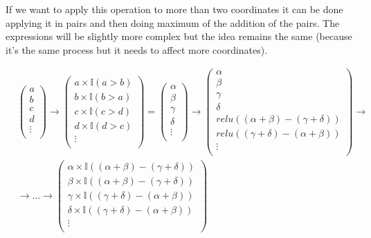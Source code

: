 If we want to apply this operation to more than two coordinates it can be done applying it in pairs and then doing maximum of the addition of the pairs. The expressions will be slightly more complex but the idea remains the same (because it's the same process but it needs to affect more coordinates).


\begin{align*}
    & \left( \begin{matrix} a \\ b \\ c \\ d \\ \vdots \\ \end{matrix} \right)
    \rightarrow
    \left( \begin{matrix} a \times \mathbb{I}(a>b) \\ b \times \mathbb{I}(b>a) \\ c \times \mathbb{I}(c>d) \\ d \times \mathbb{I}(d>c) \\ \vdots \\ \end{matrix} \right)
    = \left( \begin{matrix} \alpha \\ \beta \\ \gamma \\ \delta \\ \vdots \\ \end{matrix} \right)
    \rightarrow
    \left(\begin{matrix}
        \alpha \\ \beta \\ \gamma \\ \delta \\ 
        relu((\alpha + \beta) - (\gamma + \delta)) \\
        relu((\gamma + \delta) - (\alpha + \beta)) \\       
        \vdots \\
    \end{matrix}\right)
    \rightarrow \\ &\rightarrow
    \dots \rightarrow
    \left( \begin{matrix} 
        \alpha \times \mathbb{I}((\alpha + \beta) - (\gamma + \delta)) \\ 
        \beta  \times \mathbb{I}((\alpha + \beta) - (\gamma + \delta)) \\ 
        \gamma \times \mathbb{I}((\gamma + \delta) - (\alpha + \beta)) \\ 
        \delta \times \mathbb{I}((\gamma + \delta) - (\alpha + \beta)) \\ 
        \vdots \\ 
    \end{matrix} \right)
\end{align*}


